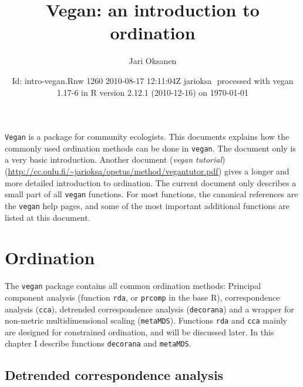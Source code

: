 \documentclass[a4paper,10pt]{amsart}
\title{Vegan: an introduction to ordination}
\author{Jari Oksanen}
\date{$ $Id: intro-vegan.Rnw 1260 2010-08-17 12:11:04Z jarioksa $ $
  processed with vegan
1.17-6
in R version 2.12.1 (2010-12-16) on \today}
\begin{document}


\maketitle

\tableofcontents


\noindent \texttt{Vegan} is a package for community ecologists.  This
documents explains how the commonly used ordination methods can be
done in \texttt{vegan}.  The document only is a very basic
introduction.  Another document (\emph{vegan tutorial})
(\url{http://cc.oulu.fi/~jarioksa/opetus/method/vegantutor.pdf}) gives
a longer and more detailed introduction to ordination.  The
current document only describes a small part of all \texttt{vegan}
functions.  For most functions, the canonical references are the
\texttt{vegan} help pages, and some of the most important additional
functions are listed at this document.

\section{Ordination}

The \texttt{vegan} package contains all common ordination methods:
Principal component analysis (function \texttt{rda}, or
\texttt{prcomp} in the base \textsf{R}), correspondence analysis
(\texttt{cca}), detrended correspondence analysis (\texttt{decorana})
and a wrapper for non-metric multidimensional scaling
(\texttt{metaMDS}).  Functions \texttt{rda} and \texttt{cca} mainly
are designed for constrained ordination, and will be discussed later.
In this chapter I describe functions \texttt{decorana} and
\texttt{metaMDS}.

\subsection{Detrended correspondence analysis}
\end{document}
